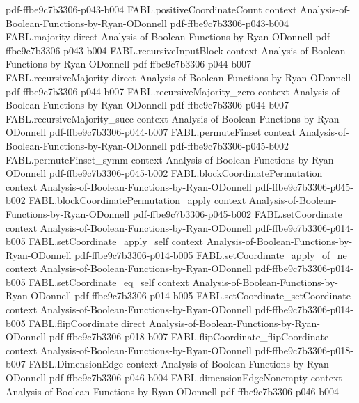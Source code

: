 \begin{theorem}
  {pdf-ffbe9c7b3306-p043-b004}
\proofstep
  {FABL.positiveCoordinateCount}
  {context}
  {Analysis-of-Boolean-Functions-by-Ryan-ODonnell}
  {pdf-ffbe9c7b3306-p043-b004}
\proofstep
  {FABL.majority}
  {direct}
  {Analysis-of-Boolean-Functions-by-Ryan-ODonnell}
  {pdf-ffbe9c7b3306-p043-b004}
\proofstep
  {FABL.recursiveInputBlock}
  {context}
  {Analysis-of-Boolean-Functions-by-Ryan-ODonnell}
  {pdf-ffbe9c7b3306-p044-b007}
\proofstep
  {FABL.recursiveMajority}
  {direct}
  {Analysis-of-Boolean-Functions-by-Ryan-ODonnell}
  {pdf-ffbe9c7b3306-p044-b007}
\proofstep
  {FABL.recursiveMajority_zero}
  {context}
  {Analysis-of-Boolean-Functions-by-Ryan-ODonnell}
  {pdf-ffbe9c7b3306-p044-b007}
\proofstep
  {FABL.recursiveMajority_succ}
  {context}
  {Analysis-of-Boolean-Functions-by-Ryan-ODonnell}
  {pdf-ffbe9c7b3306-p044-b007}
\proofstep
  {FABL.permuteFinset}
  {context}
  {Analysis-of-Boolean-Functions-by-Ryan-ODonnell}
  {pdf-ffbe9c7b3306-p045-b002}
\proofstep
  {FABL.permuteFinset_symm}
  {context}
  {Analysis-of-Boolean-Functions-by-Ryan-ODonnell}
  {pdf-ffbe9c7b3306-p045-b002}
\proofstep
  {FABL.blockCoordinatePermutation}
  {context}
  {Analysis-of-Boolean-Functions-by-Ryan-ODonnell}
  {pdf-ffbe9c7b3306-p045-b002}
\proofstep
  {FABL.blockCoordinatePermutation_apply}
  {context}
  {Analysis-of-Boolean-Functions-by-Ryan-ODonnell}
  {pdf-ffbe9c7b3306-p045-b002}
\proofstep
  {FABL.setCoordinate}
  {context}
  {Analysis-of-Boolean-Functions-by-Ryan-ODonnell}
  {pdf-ffbe9c7b3306-p014-b005}
\proofstep
  {FABL.setCoordinate_apply_self}
  {context}
  {Analysis-of-Boolean-Functions-by-Ryan-ODonnell}
  {pdf-ffbe9c7b3306-p014-b005}
\proofstep
  {FABL.setCoordinate_apply_of_ne}
  {context}
  {Analysis-of-Boolean-Functions-by-Ryan-ODonnell}
  {pdf-ffbe9c7b3306-p014-b005}
\proofstep
  {FABL.setCoordinate_eq_self}
  {context}
  {Analysis-of-Boolean-Functions-by-Ryan-ODonnell}
  {pdf-ffbe9c7b3306-p014-b005}
\proofstep
  {FABL.setCoordinate_setCoordinate}
  {context}
  {Analysis-of-Boolean-Functions-by-Ryan-ODonnell}
  {pdf-ffbe9c7b3306-p014-b005}
\proofstep
  {FABL.flipCoordinate}
  {direct}
  {Analysis-of-Boolean-Functions-by-Ryan-ODonnell}
  {pdf-ffbe9c7b3306-p018-b007}
\proofstep
  {FABL.flipCoordinate_flipCoordinate}
  {context}
  {Analysis-of-Boolean-Functions-by-Ryan-ODonnell}
  {pdf-ffbe9c7b3306-p018-b007}
\proofstep
  {FABL.DimensionEdge}
  {context}
  {Analysis-of-Boolean-Functions-by-Ryan-ODonnell}
  {pdf-ffbe9c7b3306-p046-b004}
\proofstep
  {FABL.dimensionEdgeNonempty}
  {context}
  {Analysis-of-Boolean-Functions-by-Ryan-ODonnell}
  {pdf-ffbe9c7b3306-p046-b004}

\end{theorem}
